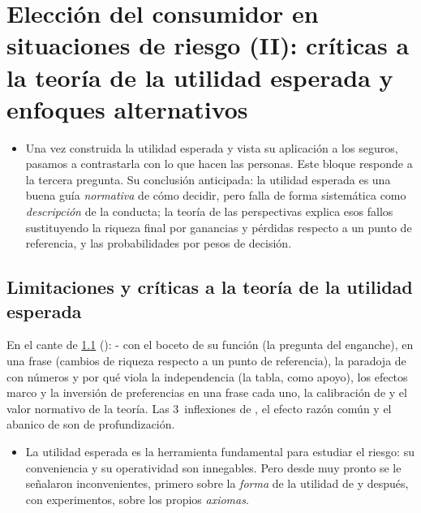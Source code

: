 \documentclass[11pt]{article}
\begin{document}
\section{Elección del consumidor en situaciones de riesgo (II):\cortetitulo{} críticas a la teoría de la utilidad esperada\cortetitulo{} y enfoques alternativos}\label{sec:criticas}

\begin{itemize}
\item Una vez construida la utilidad esperada y vista su aplicación a los seguros, pasamos a contrastarla con lo que hacen las personas. Este bloque responde a la tercera pregunta. Su conclusión anticipada: la utilidad esperada es una buena guía \emph{normativa} de cómo decidir, pero falla de forma sistemática como \emph{descripción} de la conducta; la teoría de las perspectivas explica esos fallos sustituyendo la riqueza final por ganancias y pérdidas respecto a un punto de referencia, y las probabilidades por pesos de decisión.
\end{itemize}

\subsection{Limitaciones y críticas a la teoría de la utilidad esperada}\label{sec:limitaciones}

\begin{notaopositor}
En el cante de \ref{sec:limitaciones} (): - con el boceto de su función (la pregunta del enganche),  en una frase (cambios de riqueza respecto a un punto de referencia), la paradoja de  con números y por qué viola la independencia (la tabla, como apoyo), los efectos marco y la inversión de preferencias en una frase cada uno, la calibración de  y el valor normativo de la teoría. Las 3~inflexiones de , el efecto razón común y el abanico de  son de profundización.
\end{notaopositor}

\begin{itemize}
\item La utilidad esperada es la herramienta fundamental para estudiar el riesgo: su conveniencia y su operatividad son innegables. Pero desde muy pronto se le señalaron inconvenientes, primero sobre la \emph{forma} de la utilidad de  y después, con experimentos, sobre los propios \emph{axiomas}.
\end{itemize}
\end{document}
